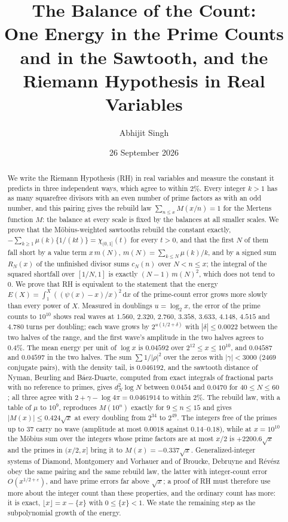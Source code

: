 \documentclass[11pt]{article}
\title{\textbf{The Balance of the Count:}\\[4pt]
\large One Energy in the Prime Counts and in the Sawtooth, and the Riemann Hypothesis in Real Variables}
\author{Abhijit Singh}
\date{26 September 2026}
\theoremstyle{definition}\newtheorem{definition}[theorem]{Definition}
\theoremstyle{remark}\newtheorem{remark}[theorem]{Remark}
\newcommand{\dd}{\,\mathrm d}\newcommand{\e}{\mathrm e}
\newcommand{\fr}[1]{\{#1\}}
\begin{document}
\maketitle
\begin{abstract}
We write the Riemann Hypothesis (RH) in real variables and measure the constant it predicts in three independent ways, which agree to within $2\%$. Every integer $k>1$ has as many squarefree divisors with an even number of prime factors as with an odd number, and this pairing gives the rebuild law $\sum_{n\le x}M(x/n)=1$ for the Mertens function $M$: the balance at every scale is fixed by the balances at all smaller scales. We prove that the Möbius-weighted sawtooths rebuild the constant exactly, $-\sum_{k\ge1}\mu(k)\fr{1/(kt)}=\chi_{(0,1]}(t)$ for every $t>0$, and that the first $N$ of them fall short by a value term $x\,m(N)$, $m(N)=\sum_{k\le N}\mu(k)/k$, and by a signed sum $R_N(x)$ of the unfinished divisor sums $c_N(n)$ over $N<n\le x$; the integral of the squared shortfall over $[1/N,1]$ is exactly $(N-1)\,m(N)^2$, which does not tend to $0$. We prove that RH is equivalent to the statement that the energy $E(X)=\int_1^X((\psi(x)-x)/x)^2\dd x$ of the prime-count error grows more slowly than every power of $X$. Measured in doublings $u=\log_2x$, the error of the prime counts to $10^{10}$ shows real waves at $1.560$, $2.320$, $2.760$, $3.358$, $3.633$, $4.148$, $4.515$ and $4.780$ turns per doubling; each wave grows by $2^{u(1/2+\delta)}$ with $|\delta|\le0.0022$ between the two halves of the range, and the first wave's amplitude in the two halves agrees to $0.4\%$. The mean energy per unit of $\log x$ is $0.04592$ over $2^{12}\le x\le10^{10}$, and $0.04587$ and $0.04597$ in the two halves. The sum $\sum1/|\rho|^2$ over the zeros with $|\gamma|<3000$ ($2469$ conjugate pairs), with the density tail, is $0.046192$, and the sawtooth distance of Nyman, Beurling and B\'aez-Duarte, computed from exact integrals of fractional parts with no reference to primes, gives $d_N^2\log N$ between $0.0454$ and $0.0470$ for $40\le N\le60$; all three agree with $2+\gamma-\log4\pi=0.0461914$ to within $2\%$. The rebuild law, with a table of $\mu$ to $10^9$, reproduces $M(10^n)$ exactly for $9\le n\le15$ and gives $|M(x)|\le0.424\sqrt x$ at every doubling from $2^{34}$ to $2^{49}$. The integers free of the primes up to $37$ carry no wave (amplitude at most $0.0018$ against $0.14$--$0.18$), while at $x=10^{10}$ the Möbius sum over the integers whose prime factors are at most $x/2$ is $+2200.6\sqrt x$ and the primes in $(x/2,x]$ bring it to $M(x)=-0.337\sqrt x$. Generalized-integer systems of Diamond, Montgomery and Vorhauer and of Broucke, Debruyne and R\'ev\'esz obey the same pairing and the same rebuild law, the latter with integer-count error $O(x^{1/2+\varepsilon})$, and have prime errors far above $\sqrt x$; a proof of RH must therefore use more about the integer count than these properties, and the ordinary count has more: it is exact, $\lfloor x\rfloor=x-\fr x$ with $0\le\fr x<1$. We state the remaining step as the subpolynomial growth of the energy.
\end{abstract}
\end{document}
